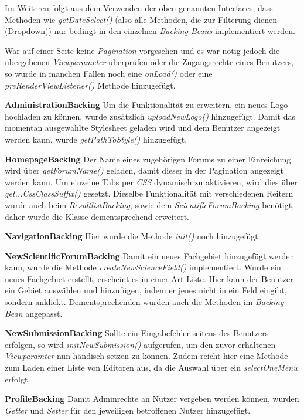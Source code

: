 Im Weiteren folgt aus dem Verwenden der oben genannten Interfaces, dass Methoden wie \emph{getDateSelect()} (also alle Methoden, die zur Filterung dienen (Dropdown)) nur bedingt in den einzelnen \emph{Backing Beans} implementiert werden.

War auf einer Seite keine \emph{Pagination} vorgesehen und es war nötig jedoch die übergebenen \emph{Viewparameter} überprüfen oder die Zugangsrechte eines Benutzers, so wurde in manchen Fällen noch eine \emph{onLoad()} oder eine \emph{preRenderViewListener()} Methode hinzugefügt.

\textbf{AdministrationBacking} Um die Funktionalität zu erweitern, ein neues Logo hochladen zu können, wurde zusätzlich \emph{uploadNewLogo()} hinzugefügt. \newline
Damit das momentan ausgewählte Stylesheet geladen wird und dem Benutzer angezeigt werden kann, wurde \emph{getPathToStyle()} hinzugefügt.

\textbf{HomepageBacking} Der Name eines zugehörigen Forums zu einer Einreichung wird über \emph{getForumName()} geladen, damit dieser in der Pagination angezeigt werden kann. \newline
Um einzelne Tabs per \emph{CSS} dynamisch zu aktivieren, wird dies über \emph{get...CssClassSuffix()} gesetzt. Dieselbe Funktionalität mit verschiedenen Reitern wurde auch beim \emph{ResultlistBacking}, sowie dem \emph{ScientificForumBacking} benötigt, daher wurde die Klasse dementsprechend erweitert.

\textbf{NavigationBacking} Hier wurde die Methode \emph{init()} noch hinzugefügt.

\textbf{NewScientificForumBacking} Damit ein neues Fachgebiet hinzugefügt werden kann, wurde die Methode \emph{createNewScienceField()} implementiert. Wurde ein neues Fachgebiet erstellt, erscheint es in einer Art Liste. Hier kann der Benutzer ein Gebiet auswählen und hinzufügen, indem er jenes nicht in ein Feld eingibt, sondern anklickt. Dementsprechenden wurden auch die Methoden im \emph{Backing Bean} angepasst.

\textbf{NewSubmissionBacking} Sollte ein Eingabefehler seitens des Benutzers erfolgen, so  wird \emph{initNewSubmission()} aufgerufen, um den zuvor erhaltenen \emph{Viewparamter} nun händisch setzen zu können.\newline
Zudem reicht hier eine Methode zum Laden einer Liste von Editoren aus, da die Auswahl über ein \emph{selectOneMenu} erfolgt.

\textbf{ProfileBacking} Damit Adminrechte an Nutzer vergeben werden können, wurden \emph{Getter} und \emph{Setter} für den jeweiligen betroffenen Nutzer hinzugefügt.

